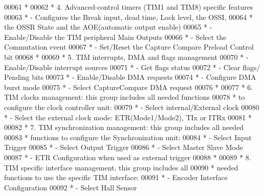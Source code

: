 \begin{DoxyCode}
00061 \textcolor{comment}{  *                   }
00062 \textcolor{comment}{  *          4. Advanced-control timers (TIM1 and TIM8) specific features}
00063 \textcolor{comment}{  *                   - Configures the Break input, dead time, Lock level, the OSSI,}
00064 \textcolor{comment}{  *                      the OSSR State and the AOE(automatic output enable)}
00065 \textcolor{comment}{  *                   - Enable/Disable the TIM peripheral Main Outputs}
00066 \textcolor{comment}{  *                   - Select the Commutation event}
00067 \textcolor{comment}{  *                   - Set/Reset the Capture Compare Preload Control bit}
00068 \textcolor{comment}{  *                              }
00069 \textcolor{comment}{  *          5. TIM interrupts, DMA and flags management}
00070 \textcolor{comment}{  *                   - Enable/Disable interrupt sources}
00071 \textcolor{comment}{  *                   - Get flags status}
00072 \textcolor{comment}{  *                   - Clear flags/ Pending bits}
00073 \textcolor{comment}{  *                   - Enable/Disable DMA requests }
00074 \textcolor{comment}{  *                   - Configure DMA burst mode}
00075 \textcolor{comment}{  *                   - Select CaptureCompare DMA request  }
00076 \textcolor{comment}{  *              }
00077 \textcolor{comment}{  *          6. TIM clocks management: this group includes all needed functions }
00078 \textcolor{comment}{  *             to configure the clock controller unit:}
00079 \textcolor{comment}{  *                   - Select internal/External clock}
00080 \textcolor{comment}{  *                   - Select the external clock mode: ETR(Mode1/Mode2), TIx or ITRx}
00081 \textcolor{comment}{  *         }
00082 \textcolor{comment}{  *          7. TIM synchronization management: this group includes all needed }
00083 \textcolor{comment}{  *             functions to configure the Synchronization unit:}
00084 \textcolor{comment}{  *                   - Select Input Trigger  }
00085 \textcolor{comment}{  *                   - Select Output Trigger  }
00086 \textcolor{comment}{  *                   - Select Master Slave Mode }
00087 \textcolor{comment}{  *                   - ETR Configuration when used as external trigger   }
00088 \textcolor{comment}{  *     }
00089 \textcolor{comment}{  *          8. TIM specific interface management, this group includes all }
00090 \textcolor{comment}{  *             needed functions to use the specific TIM interface:}
00091 \textcolor{comment}{  *                   - Encoder Interface Configuration}
00092 \textcolor{comment}{  *                   - Select Hall Sensor   }

\end{DoxyCode}
